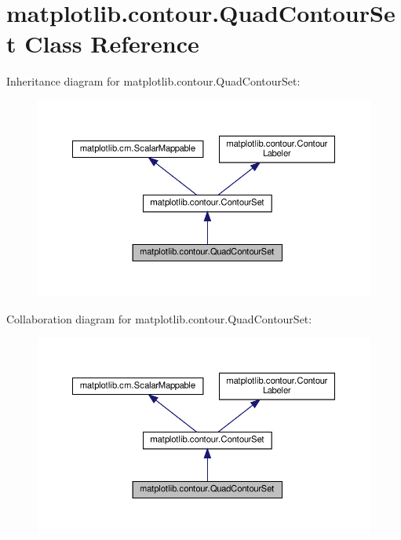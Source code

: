 \hypertarget{classmatplotlib_1_1contour_1_1QuadContourSet}{}\section{matplotlib.\+contour.\+Quad\+Contour\+Set Class Reference}
\label{classmatplotlib_1_1contour_1_1QuadContourSet}


Inheritance diagram for matplotlib.\+contour.\+Quad\+Contour\+Set\+:
\nopagebreak
\begin{figure}[H]
\begin{center}
\leavevmode
\includegraphics[width=350pt]{classmatplotlib_1_1contour_1_1QuadContourSet__inherit__graph}
\end{center}
\end{figure}


Collaboration diagram for matplotlib.\+contour.\+Quad\+Contour\+Set\+:
\nopagebreak
\begin{figure}[H]
\begin{center}
\leavevmode
\includegraphics[width=350pt]{classmatplotlib_1_1contour_1_1QuadContourSet__coll__graph}
\end{center}
\end{figure}
